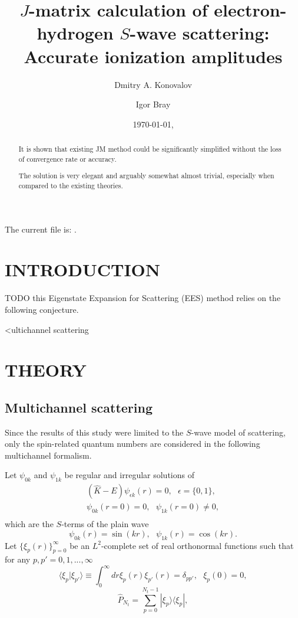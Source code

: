 \documentclass[aip
, pra
, showpacs
, aps
, twocolumn
, groupedaddress
, floatfix
]{revtex4}
\newcommand{\beq}{\begin{equation}}
\newcommand{\eeq}{\end{equation}}
\newcommand{\barr}{\begin{array}}
\newcommand{\earr}{\end{array}}
\begin{document}
\title {$J$-matrix calculation of electron-hydrogen $S$-wave scattering: Accurate ionization amplitudes}

\author{Dmitry A. Konovalov}

\author{Igor Bray}


\date{\today, \currenttime}

\begin{abstract}
It is shown that existing JM method could be significantly simplified without the loss of convergence rate or accuracy.


The solution is very elegant and arguably somewhat almost trivial, especially when compared to
the existing theories.

\end{abstract}

\maketitle
The current file is: \currfilename.

\section{INTRODUCTION}
TODO
this Eigenstate Expansion for Scattering (EES) method relies on the following conjecture.

<ultichannel scattering \cite{CA73, NO72, TF79, Nesbet78, Lucchese86}

\section{THEORY}
\subsection{Multichannel scattering}
Since the results of this study were limited to the $S$-wave model of scattering,
only the spin-related quantum numbers are considered in the
following multichannel formalism.

Let $\psi_{0k}$ and $\psi_{1k}$ be regular and irregular solutions of
\beq \barr{l}
(\hat{K}-E)  \psi_{\epsilon k} (r) =0, \ \ \ \epsilon=\{0,1\},\\
\psi_{0k}(r=0) = 0, \ \ \ \psi_{1k}(r=0) \neq 0,\\
\earr \label{H_0_E_psi}\eeq
which are the $S$-terms of the plain wave
\beq
\psi_{0k}(r) = \sin(kr) ,\ \ \
\psi_{1k}(r) = \cos(kr).
\label{K} \eeq
Let $\{\xi_p(r)\}_{p=0}^\infty$ be an $L^2$-complete set of real orthonormal functions
such that for any $p,p'=0,1,...,\infty$
\beq
\langle \xi_p | \xi_{p'} \rangle \equiv \int_0^\infty dr \xi_p(r) \xi_{p'}(r) =\delta_{pp'}, \ \ \ \xi_p(0)=0,
\eeq
\beq
\hat{P}_{N_t} = \sum_{p=0}^{N_t-1} | \xi_p \rangle \langle \xi_p |,
\label{P_N} \eeq
\end{document}
